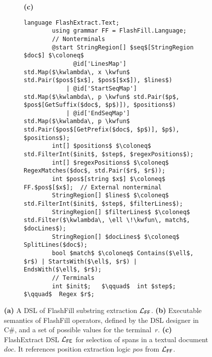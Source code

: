 \begin{figure*}
\begin{subfigure}{\textwidth}
    \hfill\textbf{(c)}
    \vspace{-0.9\baselineskip}
    \begin{lstlisting}[language=dsl,gobble=8,morekeywords={StringRegion,Regex}]
        language FlashExtract.Text;
        using grammar FF = FlashFill.Language;
        // Nonterminals
        @start StringRegion[] $seq$[StringRegion $doc$] $\coloneq$
              @id['LinesMap'] std.Map($\kwlambda\, x \kwfun$ std.Pair($pos$[$x$], $pos$[$x$]), $lines$)
            | @id['StartSeqMap'] std.Map($\kwlambda\, p \kwfun$ std.Pair($p$, $pos$[GetSuffix($doc$, $p$)]), $positions$)
            | @id['EndSeqMap'] std.Map($\kwlambda\, p \kwfun$ std.Pair($pos$[GetPrefix($doc$, $p$)], $p$), $positions$);
        int[] $positions$ $\coloneq$ std.FilterInt($init$, $step$, $regexPositions$);
        int[] $regexPositions$ $\coloneq$ RegexMatches($doc$, std.Pair($r$, $r$));
        int $pos$[string $x$] $\coloneq$ FF.$pos$[$x$];  // External nonterminal
        StringRegion[] $lines$ $\coloneq$ std.FilterInt($init$, $step$, $filterLines$);
        StringRegion[] $filterLines$ $\coloneq$ std.Filter($\kwlambda\, \ell \!\kwfun\, match$, $docLines$);
        StringRegion[] $docLines$ $\coloneq$ SplitLines($doc$);
        bool $match$ $\coloneq$ Contains($\ell$, $r$) | StartsWith($\ell$, $r$) | EndsWith($\ell$, $r$);
        // Terminals
        int $init$;   $\qquad$  int $step$;  $\qquad$  Regex $r$;
    \end{lstlisting}
    \end{subfigure}
    \caption{\textbf{(a)} A DSL of FlashFill substring extraction $\mathcal{L}_{\mathsf{FF}}$.
    \textbf{(b)} Executable semantics of FlashFill operators, defined by the DSL designer in C\#, and
    a set of possible values for the terminal~$r$.
    \textbf{(c)}
    FlashExtract DSL $\mathcal{L}_{\mathsf{FE}}$ for selection of spans in a textual document $doc$.
    It references position extraction logic $pos$ from $\mathcal{L}_{\mathsf{FF}}$. }
    \label{fig:dsl:flashfill}
\end{figure*}

